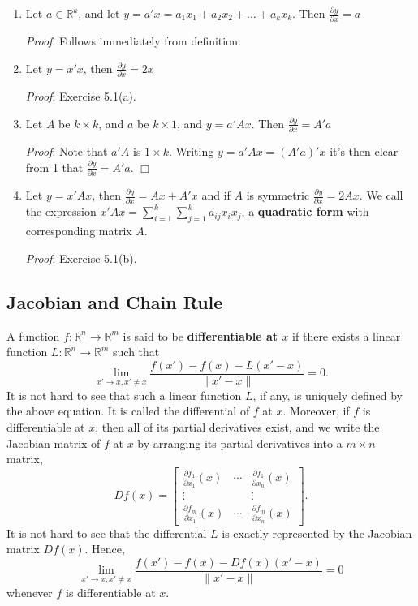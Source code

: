 \documentclass[12pt,oneside]{article}
\newcommand{\Rset}{\mathbb{R}}
\begin{document}
\begin{enumerate}
\item Let $a \in \mathbb{R}^k$, and let $y = a'x = a_1 x_1 + a_2 x_2 +
  \ldots + a_k x_k$. Then $\frac{\partial y}{\partial x} = a$

\emph{Proof}: Follows immediately from definition.

\item Let $y = x'x$, then $\frac{\partial y}{\partial x} = 2x$

\emph{Proof}: Exercise 5.1(a).

\item Let $A$ be $k \times k$, and $a$ be $k \times 1$, and $y =
  a'Ax$. Then $\frac{\partial y}{\partial x} = A'a$

\emph{Proof}:  Note that $a'A$ is $1 \times k$.  Writing $y = a'Ax = (A'a)'x$ it's then clear from 1 that $\frac{\partial y}{\partial x} = A'a$. $\Box$

\item Let $y = x'Ax$, then $\frac{\partial y}{\partial x} = Ax + A'x$
  and if $A$ is symmetric $\frac{\partial y}{\partial x} = 2Ax$. We
  call the expression $x'Ax = \displaystyle\sum_{i=1}^k
  {\displaystyle\sum_{j=1}^k {a_{ij} x_i x_j}}$, a \textbf{quadratic
  form} with corresponding matrix $A$.

\emph{Proof}: Exercise 5.1(b).

\end{enumerate}
\subsection{Jacobian and Chain Rule} \label{Sec5.2}

\noindent
A function $f: \Rset^n \to \Rset^m$ is said to be \textbf{differentiable at $x$} if there exists a linear function
$L: \Rset^n \to \Rset^m$ such that
\[
\lim_{x' \to x, x'\ne x}\frac{f(x')-f(x)-L(x'-x)}{\|x'-x\|} =0.
\]
It is not hard to see that such a linear function $L$, if any, is uniquely defined by the above equation. It is called the differential of $f$ at $x$. Moreover, if $f$ is differentiable at $x$, then all of its partial derivatives exist, and we write the Jacobian matrix of $f$ at $x$ by arranging its partial derivatives into a $m\times n$ matrix,
\[
Df(x) = \begin{bmatrix}
\frac{\partial f_1}{\partial x_1} (x) & \cdots & \frac{\partial f_1}{\partial x_n} (x) \\
\vdots & & \vdots \\
\frac{\partial f_m}{\partial x_1} (x) & \cdots & \frac{\partial f_m}{\partial x_n} (x)
\end{bmatrix}.
\]
It is not hard to see that the differential $L$ is exactly  represented by the Jacobian matrix $Df(x)$. Hence, \[
\lim_{x' \to x, x'\ne x}\frac{f(x')-f(x)-Df(x)(x'-x)}{\|x'-x\|} =0
\]
whenever $f$ is differentiable at $x$.
\end{document}
